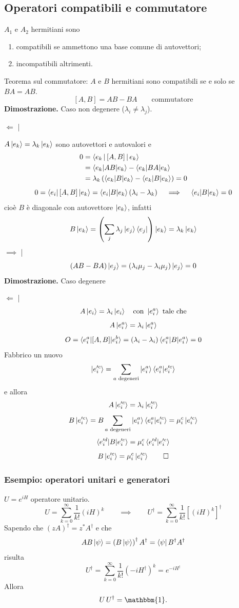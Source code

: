 \subsection{Operatori compatibili e commutatore}
\(A_1\) e \(A_2\) hermitiani sono
\begin{enumerate}
  \item compatibili se ammettono una base comune di autovettori;
  \item incompatibili altrimenti.
\end{enumerate}
Teorema sul commutatore: \(A\) e \(B\) hermitiani sono compatibili se e solo se
\(BA = AB\).
\[
  \left[ A, B \right] = AB - BA \qquad \text{commutatore}
\]
\textbf{Dimostrazione.} Caso non degenere (\(\lambda_i \neq \lambda_j\)).

\bigskip
\noindent
\(\Leftarrow\) |

\bigskip
\noindent
\(A \ket{e_k} = \lambda_k \ket{e_k}\) sono autovettori e autovalori e
\begin{align*}
  0
  &= \Braket{e_k|\left[ A, B \right]|e_k} \\
  &= \braket{e_k|AB|e_k} - \braket{e_k|BA|e_k} \\
  &= \lambda_k \left( \braket{e_k|B|e_k} - \braket{e_k|B|e_k} \right) = 0
\end{align*}
\[
  0
  = \braket{e_i|\left[ A, B \right]|e_k}
  = \braket{e_i|B|e_k} \left( \lambda_i - \lambda_k \right)
  \quad \implies \quad
  \braket{e_i|B|e_k} = 0
\]
cioè \(B\) è diagonale con autovettore \(\ket{e_k}\), infatti
\[
  B\ket{e_k}
  = \left( \sum_j \lambda_j \ket{e_j} \bra{e_j} \right) \ket{e_k}
  = \lambda_k \ket{e_k}
\]
\(\implies\) |
\[
  \left( AB - BA \right) \ket{e_j}
  = \left( \lambda_i \mu_j - \lambda_i \mu_j \right) \ket{e_j}
  = 0
\]
\textbf{Dimostrazione.} Caso degenere

\bigskip
\noindent
\(\Leftarrow\) |
\[
  A \ket{e_i} = \lambda_i \ket{e_i}
  \quad
  \text{con } \ket{e_i^a} \text{ tale che} 
\]
\[
  A \ket{e_i^a} = \lambda_i \ket{e_i^a}
\]
\[
  O
  = \braket{e_i^a|[A,B]|e_i^b}
  = (\lambda_i - \lambda_i) \braket{e_i^a|B|e_i^a}
  = 0
\]
Fabbrico un nuovo
\[
  \ket{e_i'^c} = \sum_{a \text{ degeneri}} \ket{e_i^a}\braket{e_i^a|e_i'^c}
\]
e allora
\[
  A \ket{e_i'^c} = \lambda_i \ket{e_i'^c}
\]
\[
  B \ket{e_i'^c}
  = B \sum_{a \text{ degeneri}} \ket{e_i^a}\braket{e_i^a|e_i'^c}
  = \mu_i^c \ket{e_i'^c}
\]
\[
  \braket{e_i'^d|B|e_i'^c} = \mu_i^c \braket{e_i'^d|e_i'^c}
\]
\[
  B \ket{e_i'^c} = \mu_i^c \ket{e_i'^c} \qquad \square
\]

\subsubsection{Esempio: operatori unitari e generatori}
\(U = e^{iH}\) operatore unitario.
\[
  U = \sum_{k = 0}^\infty \frac{1}{k!} \left( iH \right)^k
  \qquad \implies \qquad
  U^\dag = \sum_{k = 0}^\infty \frac{1}{k!} \left[
    \left( iH \right)^k
  \right]^\dag
\]
Sapendo che \((z A)^\dag = z^* A^\dag\) e che
\[
  AB \ket{\psi}
  = \left( B \ket{\psi} \right)^\dag A^\dag
  = \bra{\psi} B^\dag A^\dag
\]
risulta
\[
  U^\dag
  = \sum_{k = 0}^\infty \frac{1}{k!} \left( -iH^\dag \right)^k
  = e^{-iH^\dag}
\]
Allora
\[
  U \, U^\dag = \mathbbm{1}.
\]